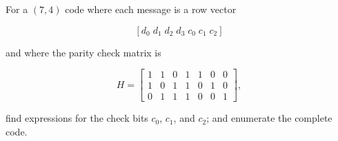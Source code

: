\begin{vworkexamplestatement}
\label{ex:cedc0:slco0:spcm0:01}
For a $(7,4)$ code where each message is a row vector

\begin{equation}
\label{eq:ex:cedc0:slco0:spcm0:01:01}
[ d_0 \; d_1 \; d_2 \; d_3 \; c_0 \; c_1 \; c_2 ]
\end{equation}

\noindent{}and where the parity check matrix is

\begin{equation}
\label{eq:ex:cedc0:slco0:spcm0:01:02}
H = \left[\begin{array}{ccccccc}
          1 & 1 & 0 & 1 & 1 & 0 & 0 \\
          1 & 0 & 1 & 1 & 0 & 1 & 0 \\
          0 & 1 & 1 & 1 & 0 & 0 & 1
          \end{array}\right],
\end{equation}

\noindent{}find expressions for the check bits $c_0$, $c_1$, and $c_2$; and
enumerate the complete code.
\end{vworkexamplestatement}
